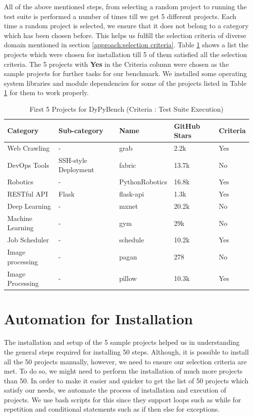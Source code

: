 All of the above mentioned steps, from selecting a random project to running the test suite is performed a number of times till we get 5 different projects. 
Each time a random project is selected, we ensure that it does not belong to a category which has been chosen before.
This helps us fulfill the selection criteria of diverse domain mentioned in section \ref{approach:selection criteria}.
Table \ref{table:first_5_projects} shows a list the projects which were chosen for installation till 5 of them satisfied all the selection criteria.
The 5 projects with \textbf{Yes} in the Criteria column were chosen as the sample projects for further tasks for our benchmark.
We installed some operating system libraries and module dependencies for some of the projects listed in Table \ref{table:first_5_projects} for them to work properly.  

\begin{table}[ht]
    \centering
    \begin{tabular}{lllll}
    \hline
    \textbf{Category} & \textbf{Sub-category} & \textbf{Name} & \textbf{GitHub Stars} & \textbf{Criteria}\\
    \hline
    Web Crawling & - & grab & 2.2k & Yes\\
    DevOps Tools & SSH-style Deployment & fabric & 13.7k & No\\
    Robotics & - & PythonRobotics & 16.8k & Yes\\
    RESTful API & Flask & flask-api & 1.3k & Yes\\
    Deep Learning & - & mxnet & 20.2k & No\\
    Machine Learning & - & gym & 29k & No\\
    Job Scheduler & - & schedule & 10.2k & Yes\\
    Image processing & - & pagan & 278 & No\\
    Image Processing & - & pillow & 10.3k & Yes\\
    \hline
    \end{tabular}
    \caption{First 5 Projects for DyPyBench (Criteria : Test Suite Execution)}
    \label{table:first_5_projects}
\end{table}

\section{Automation for Installation}
\label{impl:Automation for Installation}
The installation and setup of the 5 sample projects helped us in understanding the general steps required for installing 50 steps.
Although, it is possible to install all the 50 projects manually, however, we need to ensure our selection criteria are met.
To do so, we might need to perform the installation of much more projects than 50.
In order to make it easier and quicker to get the list of 50 projects which satisfy our needs, we automate the process of installation and execution of projects.
We use bash scripts for this since they support loops such as while for repetition and conditional statements such as if then else for exceptions.

